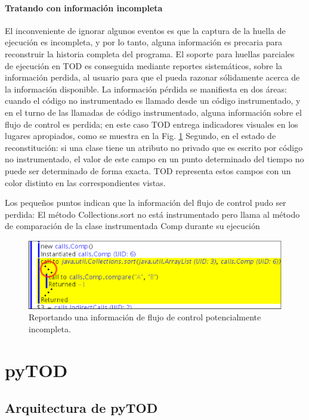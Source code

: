 \documentclass[12pt,legalpaper]{report}
\begin{document}
			\subsubsection{Tratando con información incompleta}

El inconveniente de ignorar algunos eventos es que la captura de la huella de ejecución es incompleta, y por lo tanto, alguna información es precaria para reconstruir la historia completa del programa.  El soporte para huellas parciales de ejecución en TOD es conseguida mediante reportes sistemáticos, sobre la información perdida, al usuario para que el pueda razonar sólidamente acerca de la información disponible.  La información pérdida se manifiesta en dos áreas: cuando el código no instrumentado es llamado desde un código instrumentado, y en el turno de las llamadas de código instrumentado, alguna información sobre el flujo de control es perdida; en este caso TOD entrega indicadores visuales en los lugares apropiados, como se muestra en la Fig. \ref{IndirectCFlow}  Segundo, en el estado de reconstitución: si una clase tiene un atributo no privado que es escrito por código no instrumentado, el valor de este campo en un punto determinado del tiempo no puede ser determinado de forma exacta.  TOD representa estos campos con un color distinto en las correspondientes vistas.

Los pequeños puntos indican que la información del flujo de control pudo ser perdida: El método Collections.sort no está instrumentado pero llama al método de comparación de la clase instrumentada Comp durante su ejecución


\begin{figure}[h]
	\centering
	\includegraphics[scale=0.4]{images/TOD/IndirectCFlow.eps}
	\caption{Reportando una información de flujo de control potencialmente incompleta.}
	\label{IndirectCFlow}
\end{figure}


\chapter{pyTOD}
	\section{Arquitectura de pyTOD}
\end{document}
